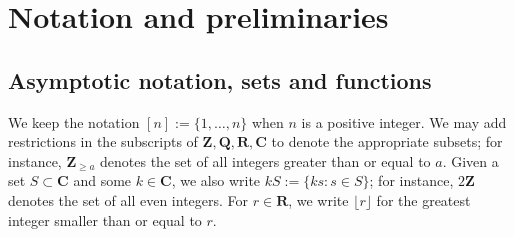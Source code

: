 \documentclass[reqno,11pt]{amsart}
\theoremstyle{definition}
\theoremstyle{remark}
\numberwithin{equation}{section}
\newcommand{\Z}{\mathbf{Z}}
\newcommand{\R}{\mathbf{R}}
\newcommand{\Q}{\mathbf{Q}}
\newcommand{\C}{\mathbf{C}}
\newcommand{\N}{\mathbf{N}}
\begin{document}

\section{Notation and preliminaries} \label{sec:preliminaries}

\subsection{Asymptotic notation, sets and functions} \label{subsec:asymptotic}
We keep the notation $[n] := \{1, \ldots, n\}$ when $n$ is a positive integer. We may add restrictions in the subscripts of $\Z, \Q, \R, \C$ to denote the appropriate subsets; for instance, $\Z_{\ge a}$ denotes the set of all integers greater than or equal to $a$. Given a set $S \subset \C$ and some $k \in \C$, we also write $kS := \{ks : s \in S\}$; for instance, $2\Z$ denotes the set of all even integers. For $r \in \R$, we write $\lfloor r \rfloor$ for the greatest integer smaller than or equal to $r$.
\end{document}
